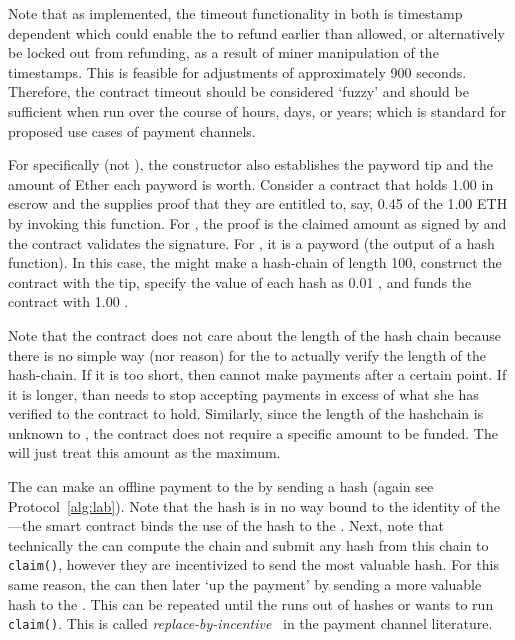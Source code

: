 Note that as implemented, the timeout functionality in both is timestamp dependent which could enable the \make to refund earlier than allowed, or alternatively be locked out from refunding, as a result of miner manipulation of the timestamps. This is feasible for adjustments of approximately 900 seconds. Therefore, the contract timeout should be considered `fuzzy' and should be sufficient when run over the course of hours, days, or years; which is standard for proposed use cases of payment channels. 

For \ew specifically (not \fifty), the constructor also establishes the payword tip and the amount of Ether each payword is worth. Consider a contract that holds 1.00 \eth in escrow and the \take supplies proof that they are entitled to, say, 0.45 of the 1.00 ETH by invoking this function. For \fifty, the proof is the claimed amount as signed by \make and the contract validates the signature. For \ew, it is a payword (\ie the output of a hash function). In this case, the \make might make a hash-chain of length 100, construct the contract with the tip, specify the value of each hash as 0.01 \eth, and funds the contract with 1.00 \eth. 

Note that the contract does not care about the length of the hash chain because there is no simple way (nor reason) for the \take to actually verify the length of the hash-chain. If it is too short, then \make cannot make payments after a certain point. If it is longer, than \take needs to stop accepting payments in excess of what she has verified to the contract to hold. Similarly, since the length of the hashchain is unknown to \take, the contract does not require a specific amount to be funded. The \take will just treat this amount as the maximum. 


The \make can make an offline payment to the \take by sending a hash (again see Protocol~\ref{alg:lab}). Note that the hash is in no way bound to the identity of the \take---the smart contract binds the use of the hash to the \take. Next, note that technically the \take can compute the chain and submit any hash from this chain to \texttt{claim()}, however they are incentivized to send the most valuable hash. For this same reason, the \make can then later `up the payment' by sending a more valuable hash to the \take. This can be repeated until the \make runs out of hashes or \take wants to run \texttt{claim()}. This is called \textit{replace-by-incentive}~\cite{MMSH16} in the payment channel literature.


